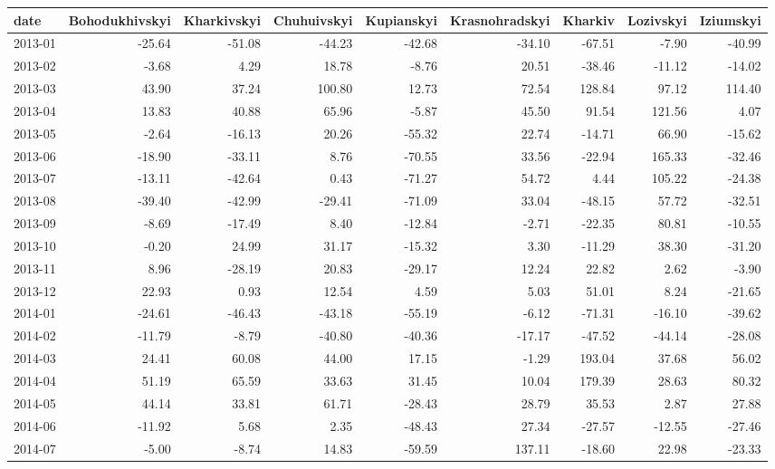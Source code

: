 \begin{table}[ht]
\centering
\begin{tabular}{lrrrrrrrr}
  \hline
date & Bohodukhivskyi & Kharkivskyi & Chuhuivskyi & Kupianskyi & Krasnohradskyi & Kharkiv & Lozivskyi & Iziumskyi \\ 
  \hline
2013-01 & -25.64 & -51.08 & -44.23 & -42.68 & -34.10 & -67.51 & -7.90 & -40.99 \\ 
  2013-02 & -3.68 & 4.29 & 18.78 & -8.76 & 20.51 & -38.46 & -11.12 & -14.02 \\ 
  2013-03 & 43.90 & 37.24 & 100.80 & 12.73 & 72.54 & 128.84 & 97.12 & 114.40 \\ 
  2013-04 & 13.83 & 40.88 & 65.96 & -5.87 & 45.50 & 91.54 & 121.56 & 4.07 \\ 
  2013-05 & -2.64 & -16.13 & 20.26 & -55.32 & 22.74 & -14.71 & 66.90 & -15.62 \\ 
  2013-06 & -18.90 & -33.11 & 8.76 & -70.55 & 33.56 & -22.94 & 165.33 & -32.46 \\ 
  2013-07 & -13.11 & -42.64 & 0.43 & -71.27 & 54.72 & 4.44 & 105.22 & -24.38 \\ 
  2013-08 & -39.40 & -42.99 & -29.41 & -71.09 & 33.04 & -48.15 & 57.72 & -32.51 \\ 
  2013-09 & -8.69 & -17.49 & 8.40 & -12.84 & -2.71 & -22.35 & 80.81 & -10.55 \\ 
  2013-10 & -0.20 & 24.99 & 31.17 & -15.32 & 3.30 & -11.29 & 38.30 & -31.20 \\ 
  2013-11 & 8.96 & -28.19 & 20.83 & -29.17 & 12.24 & 22.82 & 2.62 & -3.90 \\ 
  2013-12 & 22.93 & 0.93 & 12.54 & 4.59 & 5.03 & 51.01 & 8.24 & -21.65 \\ 
  2014-01 & -24.61 & -46.43 & -43.18 & -55.19 & -6.12 & -71.31 & -16.10 & -39.62 \\ 
  2014-02 & -11.79 & -8.79 & -40.80 & -40.36 & -17.17 & -47.52 & -44.14 & -28.08 \\ 
  2014-03 & 24.41 & 60.08 & 44.00 & 17.15 & -1.29 & 193.04 & 37.68 & 56.02 \\ 
  2014-04 & 51.19 & 65.59 & 33.63 & 31.45 & 10.04 & 179.39 & 28.63 & 80.32 \\ 
  2014-05 & 44.14 & 33.81 & 61.71 & -28.43 & 28.79 & 35.53 & 2.87 & 27.88 \\ 
  2014-06 & -11.92 & 5.68 & 2.35 & -48.43 & 27.34 & -27.57 & -12.55 & -27.46 \\ 
  2014-07 & -5.00 & -8.74 & 14.83 & -59.59 & 137.11 & -18.60 & 22.98 & -23.33 \\ 

\end{tabular}
\end{table}
